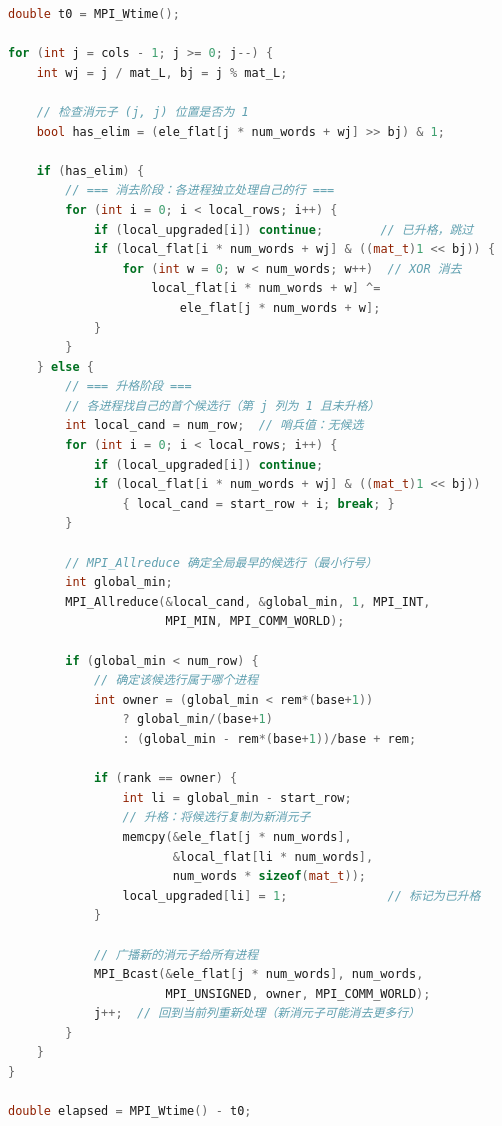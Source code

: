 \documentclass[a4paper]{article}
\begin{document}
\begin{lstlisting}[title=MPI Gröbner 基主循环（完整代码）,frame=trbl,language={C++}]
double t0 = MPI_Wtime();

for (int j = cols - 1; j >= 0; j--) {
    int wj = j / mat_L, bj = j % mat_L;

    // 检查消元子 (j, j) 位置是否为 1
    bool has_elim = (ele_flat[j * num_words + wj] >> bj) & 1;

    if (has_elim) {
        // === 消去阶段：各进程独立处理自己的行 ===
        for (int i = 0; i < local_rows; i++) {
            if (local_upgraded[i]) continue;        // 已升格，跳过
            if (local_flat[i * num_words + wj] & ((mat_t)1 << bj)) {
                for (int w = 0; w < num_words; w++)  // XOR 消去
                    local_flat[i * num_words + w] ^=
                        ele_flat[j * num_words + w];
            }
        }
    } else {
        // === 升格阶段 ===
        // 各进程找自己的首个候选行（第 j 列为 1 且未升格）
        int local_cand = num_row;  // 哨兵值：无候选
        for (int i = 0; i < local_rows; i++) {
            if (local_upgraded[i]) continue;
            if (local_flat[i * num_words + wj] & ((mat_t)1 << bj))
                { local_cand = start_row + i; break; }
        }

        // MPI_Allreduce 确定全局最早的候选行（最小行号）
        int global_min;
        MPI_Allreduce(&local_cand, &global_min, 1, MPI_INT,
                      MPI_MIN, MPI_COMM_WORLD);

        if (global_min < num_row) {
            // 确定该候选行属于哪个进程
            int owner = (global_min < rem*(base+1))
                ? global_min/(base+1)
                : (global_min - rem*(base+1))/base + rem;

            if (rank == owner) {
                int li = global_min - start_row;
                // 升格：将候选行复制为新消元子
                memcpy(&ele_flat[j * num_words],
                       &local_flat[li * num_words],
                       num_words * sizeof(mat_t));
                local_upgraded[li] = 1;              // 标记为已升格
            }

            // 广播新的消元子给所有进程
            MPI_Bcast(&ele_flat[j * num_words], num_words,
                      MPI_UNSIGNED, owner, MPI_COMM_WORLD);
            j++;  // 回到当前列重新处理（新消元子可能消去更多行）
        }
    }
}

double elapsed = MPI_Wtime() - t0;
\end{lstlisting}
\end{document}

